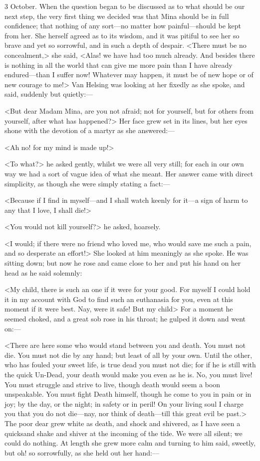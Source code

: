 \begin{diary}{3 October.}
When the question began to be discussed as to what should be our next step, the very first thing we decided was that Mina should be in full confidence; that nothing of any sort—no matter how painful—should be kept from her. She herself agreed as to its wisdom, and it was pitiful to see her so brave and yet so sorrowful, and in such a depth of despair. <There must be no concealment,> she said, <Alas! we have had too much already. And besides there is nothing in all the world that can give me more pain than I have already endured—than I suffer now! Whatever may happen, it must be of new hope or of new courage to me!> Van Helsing was looking at her fixedly as she spoke, and said, suddenly but quietly:—

<But dear Madam Mina, are you not afraid; not for yourself, but for others from yourself, after what has happened?> Her face grew set in its lines, but her eyes shone with the devotion of a martyr as she answered:—

<Ah no! for my mind is made up!>

<To what?> he asked gently, whilst we were all very still; for each in our own way we had a sort of vague idea of what she meant. Her answer came with direct simplicity, as though she were simply stating a fact:—

<Because if I find in myself—and I shall watch keenly for it—a sign of harm to any that I love, I shall die!>

<You would not kill yourself?> he asked, hoarsely.

<I would; if there were no friend who loved me, who would save me such a pain, and so desperate an effort!> She looked at him meaningly as she spoke. He was sitting down; but now he rose and came close to her and put his hand on her head as he said solemnly:

<My child, there is such an one if it were for your good. For myself I could hold it in my account with God to find such an euthanasia for you, even at this moment if it were best. Nay, were it safe! But my child\longdash> For a moment he seemed choked, and a great sob rose in his throat; he gulped it down and went on:—

<There are here some who would stand between you and death. You must not die. You must not die by any hand; but least of all by your own. Until the other, who has fouled your sweet life, is true dead you must not die; for if he is still with the quick Un-Dead, your death would make you even as he is. No, you must live! You must struggle and strive to live, though death would seem a boon unspeakable. You must fight Death himself, though he come to you in pain or in joy; by the day, or the night; in safety or in peril! On your living soul I charge you that you do not die—nay, nor think of death—till this great evil be past.> The poor dear grew white as death, and shock and shivered, as I have seen a quicksand shake and shiver at the incoming of the tide. We were all silent; we could do nothing. At length she grew more calm and turning to him said, sweetly, but oh! so sorrowfully, as she held out her hand:—


\end{diary}

